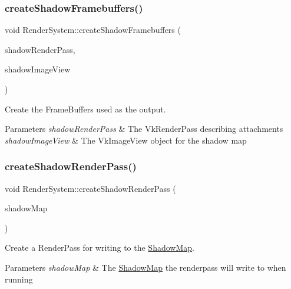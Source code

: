 \subsubsection{\texorpdfstring{createShadowFramebuffers()}{createShadowFramebuffers()}}
{\footnotesize\ttfamily void Render\+System\+::create\+Shadow\+Framebuffers (\begin{DoxyParamCaption}\item[{Vk\+Render\+Pass}]{shadow\+Render\+Pass,  }\item[{Vk\+Image\+View}]{shadow\+Image\+View }\end{DoxyParamCaption})\hspace{0.3cm}{\ttfamily [private]}}



Create the Frame\+Buffers used as the output. 


\begin{DoxyParams}{Parameters}
{\em shadow\+Render\+Pass} & The Vk\+Render\+Pass describing attachments \\
\hline
{\em shadow\+Image\+View} & The Vk\+Image\+View object for the shadow map \\
\hline
\end{DoxyParams}
\mbox{\label{class_render_system_a6c7bcbc69bc3e34c5cccd42a5a1ddf91}} 
\subsubsection{\texorpdfstring{createShadowRenderPass()}{createShadowRenderPass()}}
{\footnotesize\ttfamily void Render\+System\+::create\+Shadow\+Render\+Pass (\begin{DoxyParamCaption}\item[{const \mbox{\hyperlink{struct_shadow_map}{Shadow\+Map}} \&}]{shadow\+Map }\end{DoxyParamCaption})\hspace{0.3cm}{\ttfamily [private]}}



Create a Render\+Pass for writing to the \mbox{\hyperlink{struct_shadow_map}{Shadow\+Map}}. 


\begin{DoxyParams}{Parameters}
{\em shadow\+Map} & The \mbox{\hyperlink{struct_shadow_map}{Shadow\+Map}} the renderpass will write to when running \\
\hline
\end{DoxyParams}
\mbox{\label{class_render_system_afae24ad1ef810abc7a16ca331f4e6eef}} 
